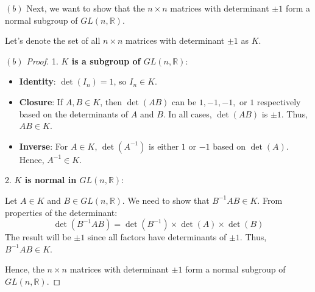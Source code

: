\documentclass[12pt]{amsart}
\theoremstyle{definition}
\numberwithin{equation}{section}
\theoremstyle{plain}
\newcommand{\R}{\mathbb{R}}
\begin{document}
\begin{exercise}{40}
    \textbf{\((b)\)} Next, we want to show that the \( n \times n \) matrices with determinant \( \pm 1 \) form a normal subgroup of \( GL(n,\R) \).
    
    Let's denote the set of all \( n \times n \) matrices with determinant \( \pm 1 \) as \( K \).
    
    \begin{proof}[\((b)\) Proof]
    
    1. \textbf{\( K \) is a subgroup of \( GL(n,\R) \)}:
    
       \begin{itemize}
        \item \textbf{Identity}: \( \det(I_n) = 1 \), so \( I_n \in K \).
        \item \textbf{Closure}: If \( A, B \in K \), then \( \det(AB) \) can be \( 1, -1, -1, \) or \( 1 \) respectively based on the determinants of \( A \) and \( B \). In all cases, \( \det(AB) \) is \( \pm 1 \). Thus, \( AB \in K \).
        \item \textbf{Inverse}: For \( A \in K \), \( \det(A^{-1}) \) is either \( 1 \) or \( -1 \) based on \( \det(A) \). Hence, \( A^{-1} \in K \).
       \end{itemize}
    
    2. \textbf{\( K \) is normal in \( GL(n,\R) \)}:
    
       Let \( A \in K \) and \( B \in GL(n,\R) \). We need to show that \( B^{-1}AB \in K \). From properties of the determinant:
       \[
       \det(B^{-1}AB) = \det(B^{-1}) \times \det(A) \times \det(B)
       \]
       The result will be \( \pm 1 \) since all factors have determinants of \( \pm 1 \). Thus, \( B^{-1}AB \in K \).
    
    Hence, the \( n \times n \) matrices with determinant \( \pm 1 \) form a normal subgroup of \( GL(n,\R) \).
    
    \end{proof}
\end{exercise}
\vspace*{60pt}
\end{document}
